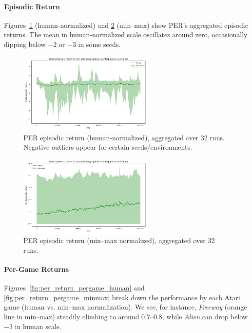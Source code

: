 \paragraph{Episodic Return}
Figures~\ref{fig:per_return_human} (human-normalized) and \ref{fig:per_return_minmax} (min--max) show PER's aggregated episodic returns. The mean in human-normalized scale oscillates around zero, occasionally dipping below $-2$ or $-3$ in some seeds.

\begin{figure}
	\centering
	\includegraphics[width=0.6\textwidth]{figures/per/charts_episodic_return_human_per_atari.png}
	\caption{PER episodic return (human-normalized), aggregated over 32 runs. 
		Negative outliers appear for certain seeds/environments.}
	\label{fig:per_return_human}
\end{figure}

\begin{figure}
	\centering
	\includegraphics[width=0.6\textwidth]{figures/per/charts_episodic_return_minmax_per_atari.png}
	\caption{PER episodic return (min--max normalized), aggregated over 32 runs.}
	\label{fig:per_return_minmax}
\end{figure}

\paragraph{Per-Game Returns}
Figures~\ref{fig:per_return_pergame_human} and \vref{fig:per_return_pergame_minmax} break down the performance by each Atari game (human vs. min--max normalization). We see, for instance, \emph{Freeway} (orange line in min--max) steadily climbing to around 0.7--0.8, while \emph{Alien} can drop below $-3$ in human scale. 

